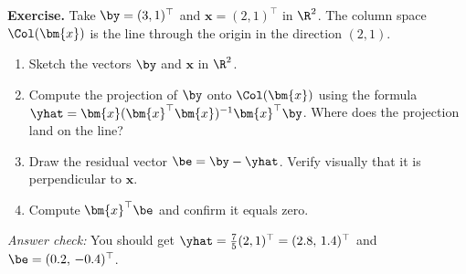 

%






\begin{stopandthink}
\textbf{Exercise.}
Take $\by = (3, 1)^\top$ and $\bm{x} = (2, 1)^\top$ in $\R^2$.
The column space $\Col(\bm{x})$ is the line through the origin in the
direction $(2,1)$.
\begin{enumerate}[nosep]
  \item Sketch the vectors $\by$ and $\bm{x}$ in $\R^2$.
  \item Compute the projection of $\by$ onto $\Col(\bm{x})$ using the
        formula $\yhat = \bm{x}(\bm{x}^\top\bm{x})^{-1}\bm{x}^\top\by$.
        Where does the projection land on the line?
  \item Draw the residual vector $\be = \by - \yhat$.
        Verify visually that it is perpendicular to $\bm{x}$.
  \item Compute $\bm{x}^\top \be$ and confirm it equals zero.
\end{enumerate}
\emph{Answer check:} You should get $\yhat = \tfrac{7}{5}(2, 1)^\top
= (2.8,\, 1.4)^\top$ and $\be = (0.2,\, -0.4)^\top$.
\end{stopandthink}


